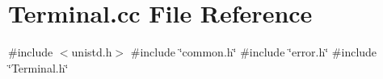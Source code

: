 \section{Terminal.\+cc File Reference}
\label{Terminal_8cc}
{\ttfamily \#include $<$unistd.\+h$>$}\newline
{\ttfamily \#include \char`\"{}common.\+h\char`\"{}}\newline
{\ttfamily \#include \char`\"{}error.\+h\char`\"{}}\newline
{\ttfamily \#include \char`\"{}Terminal.\+h\char`\"{}}\newline
